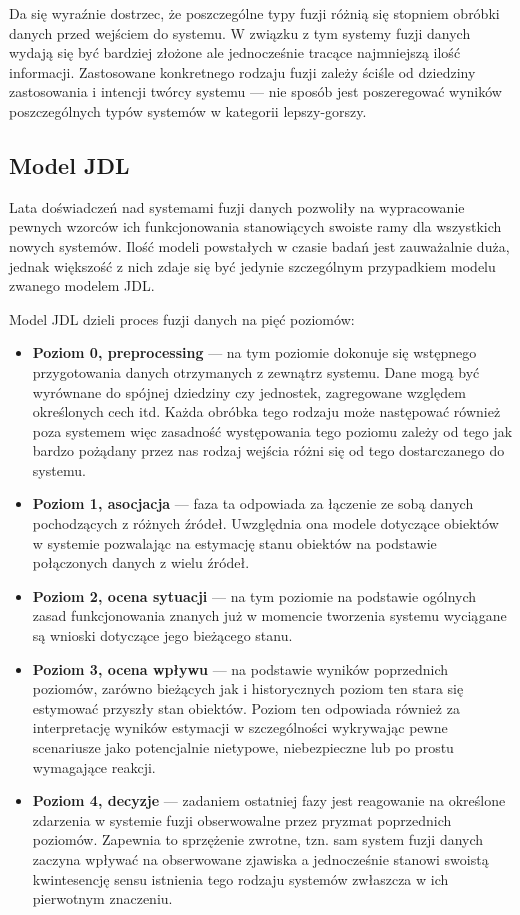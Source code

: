 \par{
Da się wyraźnie dostrzec, że poszczególne typy fuzji różnią się stopniem obróbki danych przed wejściem do systemu. W związku z tym systemy fuzji danych wydają się być bardziej złożone ale jednocześnie tracące najmniejszą ilość informacji. Zastosowane konkretnego rodzaju fuzji zależy ściśle od dziedziny zastosowania i intencji twórcy systemu --- nie sposób jest poszeregować wyników poszczególnych typów systemów w kategorii lepszy-gorszy.
}
\subsection{Model JDL}
\par{
Lata doświadczeń nad systemami fuzji danych pozwoliły na wypracowanie pewnych wzorców ich funkcjonowania stanowiących swoiste ramy dla wszystkich nowych systemów. Ilość modeli powstałych w czasie badań jest zauważalnie duża, jednak większość z nich zdaje się być jedynie szczególnym przypadkiem modelu zwanego modelem JDL.
}
\par{
Model JDL dzieli proces fuzji danych na pięć poziomów:
\begin{itemize}
\item \textbf{Poziom 0, preprocessing} --- na tym poziomie dokonuje się wstępnego przygotowania danych otrzymanych z zewnątrz systemu. Dane mogą być wyrównane do spójnej dziedziny czy jednostek, zagregowane względem określonych cech itd. Każda obróbka tego rodzaju może następować również poza systemem więc zasadność występowania tego poziomu zależy od tego jak bardzo pożądany przez nas rodzaj wejścia różni się od tego dostarczanego do systemu.
\item \textbf{Poziom 1, asocjacja} --- faza ta odpowiada za łączenie ze sobą danych pochodzących z różnych źródeł. Uwzględnia ona modele dotyczące obiektów w systemie pozwalając na estymację stanu obiektów na podstawie połączonych danych z wielu źródeł.
\item \textbf{Poziom 2, ocena sytuacji} --- na tym poziomie na podstawie ogólnych zasad funkcjonowania znanych już w momencie tworzenia systemu wyciągane są wnioski dotyczące jego bieżącego stanu.
\item \textbf{Poziom 3, ocena wpływu} --- na podstawie wyników poprzednich poziomów, zarówno bieżących jak i historycznych poziom ten stara się estymować przyszły stan obiektów. Poziom ten odpowiada również za interpretację wyników estymacji w szczególności wykrywając pewne scenariusze jako potencjalnie nietypowe, niebezpieczne lub po prostu wymagające reakcji.
\item \textbf{Poziom 4, decyzje} --- zadaniem ostatniej fazy jest reagowanie na określone zdarzenia w systemie fuzji obserwowalne przez pryzmat poprzednich poziomów. Zapewnia to sprzężenie zwrotne, tzn. sam system fuzji danych zaczyna wpływać na obserwowane zjawiska a jednocześnie stanowi swoistą kwintesencję sensu istnienia tego rodzaju systemów zwłaszcza w ich pierwotnym znaczeniu.
\end{itemize}
}
